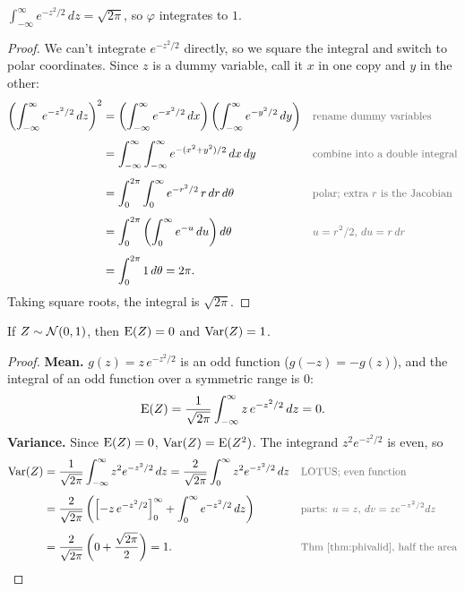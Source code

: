 \begin{theorem}\label{thm:phivalid}
  $\displaystyle\int_{-\infty}^{\infty} e^{-z^{2}/2}\,dz = \sqrt{2\pi}$, so $\varphi$ integrates to $1$.
\end{theorem}

\begin{proof}
  We can't integrate $e^{-z^{2}/2}$ directly, so we square the integral and switch to polar coordinates. Since $z$ is a dummy variable, call it $x$ in one copy and $y$ in the other:
  \begin{align*}
    \left(\int_{-\infty}^{\infty} e^{-z^{2}/2}\,dz\right)^{2}
      &= \left(\int_{-\infty}^{\infty} e^{-x^{2}/2}\,dx\right)\left(\int_{-\infty}^{\infty} e^{-y^{2}/2}\,dy\right)
      && \by{rename dummy variables} \\[0.4em]
      &= \int_{-\infty}^{\infty}\int_{-\infty}^{\infty} e^{-(x^{2} + y^{2})/2}\,dx\,dy
      && \by{combine into a double integral} \\[0.4em]
      &= \int_{0}^{2\pi}\int_{0}^{\infty} e^{-r^{2}/2}\, r\,dr\,d\theta
      && \by{polar; extra $r$ is the Jacobian} \\[0.4em]
      &= \int_{0}^{2\pi}\left(\int_{0}^{\infty} e^{-u}\,du\right) d\theta
      && \by{$u = r^{2}/2$, $du = r\,dr$} \\[0.4em]
      &= \int_{0}^{2\pi} 1\,d\theta = 2\pi.
  \end{align*}
  Taking square roots, the integral is $\sqrt{2\pi}$.
\end{proof}

\begin{theorem}\label{thm:stdnormalEV}
  If $Z \sim \mathcal{N}(0, 1)$, then $\operatorname{E}(Z) = 0$ and $\operatorname{Var}(Z) = 1$.
\end{theorem}

\begin{proof}
  \textbf{Mean.} $g(z) = z\,e^{-z^{2}/2}$ is an odd function ($g(-z) = -g(z)$), and the integral of an odd function over a symmetric range is $0$:
  \[
    \operatorname{E}(Z) = \frac{1}{\sqrt{2\pi}} \int_{-\infty}^{\infty} z\, e^{-z^{2}/2}\,dz = 0.
  \]
  \textbf{Variance.} Since $\operatorname{E}(Z) = 0$, $\operatorname{Var}(Z) = \operatorname{E}(Z^{2})$. The integrand $z^{2}e^{-z^{2}/2}$ is even, so
  \begin{align*}
    \Var(Z)
      &= \frac{1}{\sqrt{2\pi}} \int_{-\infty}^{\infty} z^{2} e^{-z^{2}/2}\,dz
       = \frac{2}{\sqrt{2\pi}} \int_{0}^{\infty} z^{2} e^{-z^{2}/2}\,dz
      && \by{LOTUS; even function} \\[0.4em]
      &= \frac{2}{\sqrt{2\pi}} \left( \Bigl[-z\,e^{-z^{2}/2}\Bigr]_{0}^{\infty} + \int_{0}^{\infty} e^{-z^{2}/2}\,dz \right)
      && \by{parts: $u = z$, $dv = z e^{-z^{2}/2}dz$} \\[0.4em]
      &= \frac{2}{\sqrt{2\pi}} \left( 0 + \frac{\sqrt{2\pi}}{2} \right) = 1.
      && \by{Thm~\ref{thm:phivalid}, half the area}
  \end{align*}
\end{proof}

